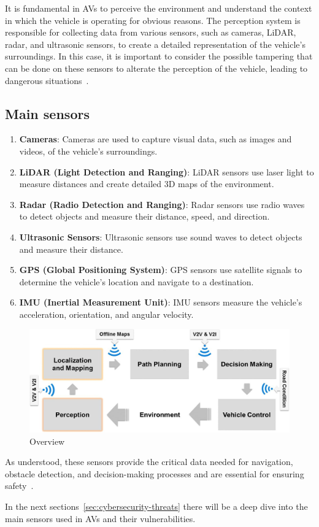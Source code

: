 It is fundamental in AVs to perceive the environment and understand the context in which the vehicle is operating for obvious reasons.
The perception system is responsible for collecting data from various sensors, such as cameras, LiDAR, radar, and ultrasonic sensors, to create a detailed representation of the vehicle's surroundings.
In this case, it is important to consider the possible tampering that can be done on these sensors to alterate the perception of the vehicle, leading to dangerous situations~\cite{kim2020cybersecurity, sec-sensors-2023, metro2020analysis, sensors}.

\subsection{Main sensors}\label{subsec:main-sensors}

\begin{enumerate}
    \item \textbf{Cameras}: Cameras are used to capture visual data, such as images and videos, of the vehicle's surroundings.
    \item \textbf{LiDAR (Light Detection and Ranging)}: LiDAR sensors use laser light to measure distances and create detailed 3D maps of the environment.
    \item \textbf{Radar (Radio Detection and Ranging)}: Radar sensors use radio waves to detect objects and measure their distance, speed, and direction.
    \item \textbf{Ultrasonic Sensors}: Ultrasonic sensors use sound waves to detect objects and measure their distance.
    \item \textbf{GPS (Global Positioning System)}: GPS sensors use satellite signals to determine the vehicle's location and navigate to a destination.
    \item \textbf{IMU (Inertial Measurement Unit)}: IMU sensors measure the vehicle's acceleration, orientation, and angular velocity.
\end{enumerate}

\begin{figure}[!htb]
    \centering
    \includegraphics[width=0.7\linewidth]{figures/perception}
    \caption{Overview}
    \label{fig:sensors}
\end{figure}

As understood, these sensors provide the critical data needed for navigation, obstacle
detection, and decision-making processes and are essential for ensuring safety~\cite{unknown2020connected,cybersec}.

In the next sections~\ref{sec:cybersecurity-threats} there will be a deep dive into the main sensors used in AVs and their vulnerabilities.
